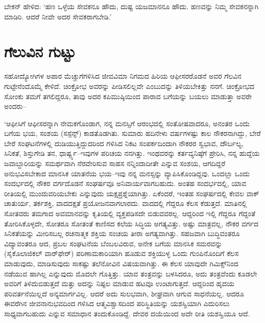 ಬೇಕನ್ ಹೇಳಿದ: ‘ಹಣ ಒಳ್ಳೆಯ ಸೇವಕನೂ ಹೌದು, ದುಷ್ಟ ಯಜಮಾನನೂ ಹೌದು. ಹಣವನ್ನು ನಿಮ್ಮ ಸೇವಕನನ್ನಾಗಿ ಮಾಡಿರಿ. ಆದರೆ ನೀವೇ ಅದರ ಸೇವಕರಾಗಬೇಡಿ.’


\section*{ಗೆಲುವಿನ ಗುಟ್ಟು}


ಸಹೋದ್ಯೋಗಿಗಳ ಅಪಾರ ಮೆಚ್ಚುಗೆಗಳಿಸಿದ ಜೀವವಿಮಾ ನಿಗಮದ ಹಿರಿಯ ಆಫೀಸರರೊಡನೆ ಅವರ ಗೆಲವಿನ ಗುಟ್ಟೇನೆಂದೊಮ್ಮೆ ಕೇಳಿದೆ. ಚಿಂಕ್ರೋಭ ಅವರನ್ನು ಪೀಡಿಸಲಿಲ್ಲವೇ ಎಂಬುದನ್ನು ತಿಳಿಯಬೇಕಿತ್ತು ನನಗೆ. ಚಿಂಕ್ರೋಭದ ಸೋಂಕು ತಮಗೆ ತಗಲಿದ್ದರೂ, ತಾವು ಅದರ ಕಪಿಮುಷ್ಠಿಯಿಂದ ಪಾರಾದ ಬಗೆಯನ್ನು ಬಯಲು ಮಾಡುತ್ತಾ ಅವರೇ ಅಂದರು–

‘ಆಫೀಸಿಗೆ ಆಫೀಸರನ್ನಾಗಿ ನೇಮಕಗೊಂಡಾಗ, ನನ್ನ ಮನಸ್ಸಿಗೆ ಆರಂಭದಲ್ಲಿ ಸಂತೋಷವಾದರೂ, ಅನಂತರ ಒಂದು ಬಗೆಯ ಭಯ, ಸಂಶಯ (ಸಸ್ಪೆನ್ಸ್​) ಕಾಡತೊಡಗಿತು. ಸುಮಾರು ಹದಿನೇಳು ವರ್ಷಗಳಷ್ಟು ಕಾಲ ನೌಕರನಾಗಿದ್ದು, ಬೇರೆ ಬೇರೆ ಸಂಘಟನೆಗಳಲ್ಲಿ ದುಡಿಯುತ್ತಿದ್ದುದರಿಂದ ಗಳಿಸಿದ ನಿಕಟ ಸಂಪರ್ಕದಿಂದಾಗಿ ನೌಕರರ ಸ್ವಭಾವ, ದೌರ್ಬಲ್ಯ, ಸಿನಿಕತೆ, ಶಿಸ್ತುಗೇಡಿ ತನ, ಧಾರ್ಷ್ಟ್ಯ–ಇವುಗಳ ಪರಿಚಯ ನನಗಿತ್ತು. ಇಂಥವರನ್ನು ಕರ್ತವ್ಯನಿಷ್ಠೆಗೆ ಪ್ರೇರಿಸಿ, ನನ್ನ ಹುದ್ದೆಯ ಜವಾಬ್ದಾರಿಯನ್ನು ಸಮರ್ಥವಾಗಿ ನೆರವೇರಿಸುವ ಸಾಹಸ ನನ್ನಿಂದಾದೀತೇ ಎನ್ನುವ ಸಂಶಯ, ಆಗದಿದ್ದರೆ ಅನುಭವಿಸಬೇಕಾದ ಮಾನಸಿಕ ಯಾತನೆಯ ಭಯ–ಇವು ನನ್ನ ಮನಸ್ಸನ್ನು ವ್ಯಾಪಿಸಿಕೊಂಡಿದ್ದವು. ಒಂದಲ್ಲಾ ಒಂದು ಸಂದರ್ಭದಲ್ಲಿ ನೌಕರ ವರ್ಗದೊಡನೆ ಸಂಘರ್ಷವೂ ಅನಿವಾರ್ಯವಾಗಬಹುದು. ಅಂತಹ ಸಂದರ್ಭದಲ್ಲಿ, ಯಾವ ರೀತಿಯಲ್ಲಿ ಮುಂದುವರಿಯಬೇಕು ಎನ್ನುವುದು ಯಕ್ಷಪ್ರಶ್ನೆಯಾಗಿತ್ತು. ಏಕೆಂದರೆ, ಇಂತಹ ಸಂಘರ್ಷದಲ್ಲಿ ಕೇವಲ ವಾಕ್​\-ಚಾತುರ್ಯ, ತರ್ಕಶಕ್ತಿ, ವಾದದಕ್ಷತೆ ಪ್ರಯೋಜನವಾಗಲಾರದು. ವಾದದಲ್ಲಿ ಗೆದ್ದರೂ ಕೆಲಸ ಕೆಡುತ್ತದೆ. ಮಾತಿನಲ್ಲಿ ಸೋತವರು ತಮಗಾದ ಅವಮಾನವನ್ನು ಕೃತಿಯಲ್ಲಿ ವ್ಯಕ್ತಪಡಿಸದೇ ಬಿಡುವವರಲ್ಲ. ಆದ್ದರಿಂದ ಇಲ್ಲಿ ಗೆದ್ದರೂ ಗೆದ್ದಂತೆ ತೋರಿಸಿಕೊಳ್ಳದೇ, ಸೋತರೂ ಸೋತಂತೆ ಕಾಣಿಸದ ಕಲೆಯ ಸಿದ್ಧಿಯ ಅಗತ್ಯವಿತ್ತು. ಅಷ್ಟು ಮಾತ್ರವಲ್ಲ, ನೌಕರ ವರ್ಗದ ಸಿನಿಕತೆಯನ್ನು ಮೀರಿಸಬಲ್ಲ ರಚನಾತ್ಮಕ ಶಕ್ತಿಯ ಸಂಚಯ ತೀರಾ ಅಗತ್ಯವಾಗಿತ್ತು. ಸಹಜವಾಗಿ ಬುದ್ಧಿವಂತರೂ ವಿದ್ಯಾವಂತರೂ ಆದ, ಪ್ರಬಲ ಸಂಘಟನೆಯ ಬೆಂಬಲವಿರುವ, ಅನೇಕ ಬಗೆಯ ಮಾನಸಿಕ ಸಮರವನ್ನು (ಸೈಕೊಲಾಜಿಕಲ್ ವಾರ್​ಫೇರ್​) ಪರಿಣಾಮಕಾರಿಯಾಗಿ ಹೂಡುವ ಶಕ್ತಿಯುಳ್ಳ ಒಂದು ಗುಂಪಿನೊಂದಿಗೆ ಕೆಲಸ ಮಾಡುವುದು, ಮಾಡಿಸುವುದು ಸಾಕಷ್ಟು ತಲೆನೋವಿನ ವಿಷಯವಾಗಿತ್ತು. ಈ ಕೆಲಸ ಯಾವುದೇ ಗಿಮಿಕ್ಸ್​ನಿಂದ ನಡೆಯುವ ಹಾಗಿಲ್ಲ ಎನ್ನುವುದು ಮೊದಲೇ ಗೊತ್ತಿತ್ತು. ಯಾವ ತಂತ್ರವನ್ನು ಬಳಸಿದರೂ, ಅದು ತಂತ್ರವೆಂದು ಕೂಡಲೇ ಅವರಿಗೆ ತಿಳಿದುಬಿಡುತ್ತದೆ ಮತ್ತು ಅದನ್ನು ನಿಷ್ಫಲ ಮಾಡುವ ಹಟವೂ ಉಂಟಾಗುತ್ತದೆ. ಆದ್ದರಿಂದ ಹೃದಯ ಪರಿವರ್ತನೆಯಿಲ್ಲದೆ ಅನ್ಯಮಾರ್ಗವಿಲ್ಲ. ಆದರೆ ಅದು ಸುಲಭವಾಗಿ, ಶೀಘ್ರವಾಗಿ ಆಗುವ ಸಾಧನೆಯಲ್ಲ. ಆದರೂ ಈವರೆಗಿನ ಜೀವನಾನುಭವದಿಂದ ಗಳಿಸಿದ ಆತ್ಮವಿಶ್ವಾಸದಿಂದ ಪರಿಸ್ಥಿತಿಯನ್ನು ಯಶಸ್ವಿಯಾಗಿ ಎದುರಿಸಲು ಸಾಧ್ಯವಾಗಬಹುದು ಎನ್ನುವ ಸಮಾಧಾನ ತಂದುಕೊಂಡಿದ್ದೆ. ದೇವರ ದಯೆಯಿಂದ ಅದೇ ರೀತಿ ಯಶಸ್ವಿಯೂ ಆದೆ.

